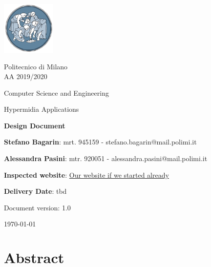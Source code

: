 \documentclass[11pt, a4paperm, hidelinks]{article}
\begin{document}
	\begin{titlepage}
		\centering
		\includegraphics[width=0.20\textwidth]{./assets/polimi-logo.png}\par

		{Politecnico di Milano \\ AA 2019/2020} \par
		\vspace{1.5cm}

		{Computer Science and Engineering}\par
		\Large{Hypermidia Applications}\par
		\vspace{1.0cm}

		{\LARGE \textbf{Design Document} \par}
		\vspace{1.5cm}

		{\normalsize {\textbf{Stefano Bagarin}: mrt. 945159 -  stefano.bagarin@mail.polimi.it }\par}
		\vspace{0.2cm}
		{\normalsize{\textbf{Alessandra Pasini}: mtr. 920051 - alessandra.pasini@mail.polimi.it}\par}
		\vspace{1.0cm}
		
		{\normalsize {\textbf{Inspected website}: \url{Our website if we started already}}\par}
		\vspace{0.2cm}
		{\normalsize {\textbf{Delivery Date}: tbd}\par}
		\vfill

		{\large Document version: 1.0\par}
		{\large \today \par}
	\end{titlepage}

	\tableofcontents
	\clearpage


	\section{Abstract}
	
	\clearpage
\end{document}

